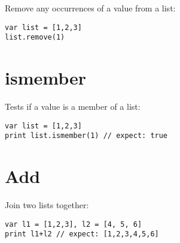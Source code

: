 Remove any occurrences of a value from a list:

\begin{lstlisting}
var list = [1,2,3]
list.remove(1)
\end{lstlisting}

\hypertarget{ismember}{%
\section{ismember}\label{ismember}}

Tests if a value is a member of a list:

\begin{lstlisting}
var list = [1,2,3]
print list.ismember(1) // expect: true
\end{lstlisting}

\hypertarget{add}{%
\section{Add}\label{add}}

Join two lists together:

\begin{lstlisting}
var l1 = [1,2,3], l2 = [4, 5, 6]
print l1+l2 // expect: [1,2,3,4,5,6]
\end{lstlisting}
